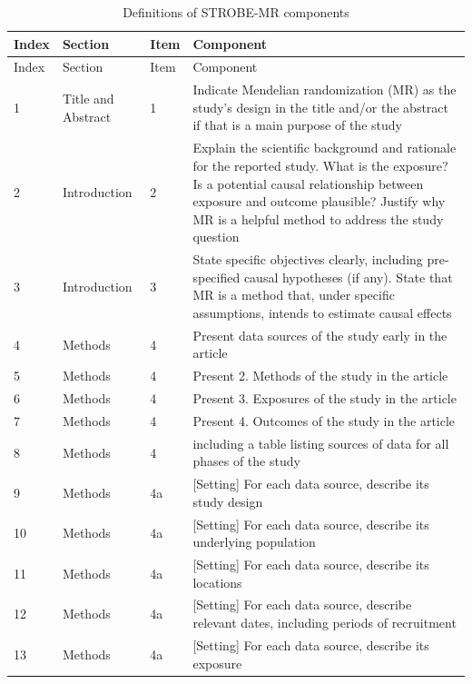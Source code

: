 
\setlength{\LTleft}{0pt}
\setlength{\LTright}{0pt}
\setlength{\tabcolsep}{4pt}
\small
\begin{longtable}{@{}lll p{9cm}@{}}
\caption{Definitions of STROBE-MR components}
\label{tab:def:component} \\

\toprule
Index & Section & Item & Component \\
\midrule
\endfirsthead

\toprule
Index & Section & Item & Component \\
\midrule
\endhead

\bottomrule
\endfoot

1 & Title and Abstract & 1 & Indicate Mendelian randomization (MR) as the study's design in the title and/or the abstract if that is a main purpose of the study \\
2 & Introduction & 2 & Explain the scientific background and rationale for the reported study. What is the exposure? Is a potential causal relationship between exposure and outcome plausible? Justify why MR is a helpful method to address the study question \\
3 & Introduction & 3 & State specific objectives clearly, including pre-specified causal hypotheses (if any). State that MR is a method that, under specific assumptions, intends to estimate causal effects \\
4 & Methods & 4 & Present data sources of the study early in the article \\
5 & Methods & 4 & Present 2. Methods of the study in the article \\
6 & Methods & 4 & Present 3. Exposures of the study in the article \\
7 & Methods & 4 & Present 4. Outcomes of the study in the article \\
8 & Methods & 4 & including a table listing sources of data for all phases of the study \\
9 & Methods & 4a & [Setting] For each data source, describe its study design \\
10 & Methods & 4a & [Setting] For each data source, describe its underlying population \\
11 & Methods & 4a & [Setting] For each data source,  describe its locations \\
12 & Methods & 4a & [Setting] For each data source, describe relevant dates, including periods of recruitment \\
13 & Methods & 4a & [Setting] For each data source, describe its exposure \\

\end{longtable}
